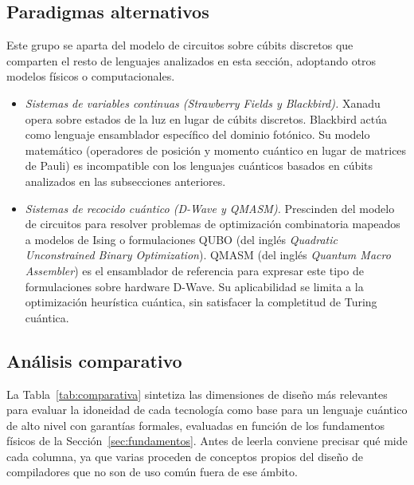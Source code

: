 \subsection{Paradigmas alternativos}
\label{subsec:alternativos}

Este grupo se aparta del modelo de circuitos sobre cúbits discretos que comparten el resto de lenguajes analizados en esta sección, adoptando otros modelos físicos o computacionales.

\begin{itemize}
  \item \textit{Sistemas de variables continuas (Strawberry Fields y Blackbird).} Xanadu opera sobre estados de la luz en lugar de cúbits discretos. Blackbird actúa como lenguaje ensamblador específico del dominio fotónico. Su modelo matemático (operadores de posición y momento cuántico en lugar de matrices de Pauli) es incompatible con los lenguajes cuánticos basados en cúbits analizados en las subsecciones anteriores.

  \item \textit{Sistemas de recocido cuántico (D-Wave y QMASM).} Prescinden del modelo de circuitos para resolver problemas de optimización combinatoria mapeados a modelos de Ising o formulaciones QUBO (del inglés \textit{Quadratic Unconstrained Binary Optimization}). QMASM (del inglés \textit{Quantum Macro Assembler}) es el ensamblador de referencia para expresar este tipo de formulaciones sobre hardware D-Wave. Su aplicabilidad se limita a la optimización heurística cuántica, sin satisfacer la completitud de Turing cuántica.
\end{itemize}

\subsection{Análisis comparativo}
\label{subsec:comparativa}

La Tabla~\ref{tab:comparativa} sintetiza las dimensiones de diseño más relevantes para evaluar la idoneidad de cada tecnología como base para un lenguaje cuántico de alto nivel con garantías formales, evaluadas en función de los fundamentos físicos de la Sección~\ref{sec:fundamentos}. Antes de leerla conviene precisar qué mide cada columna, ya que varias proceden de conceptos propios del diseño de compiladores que no son de uso común fuera de ese ámbito.

